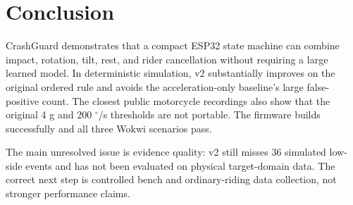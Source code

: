 \documentclass[12pt,a4paper]{article}
\newcommand{\degree}{\ensuremath{^{\circ}}}
\begin{document}
\section{Conclusion}

CrashGuard demonstrates that a compact ESP32 state machine can combine
impact, rotation, tilt, rest, and rider cancellation without requiring a
large learned model. In deterministic simulation, v2 substantially improves
on the original ordered rule and avoids the acceleration-only baseline's
large false-positive count. The closest public motorcycle recordings also
show that the original 4 g and 200 $\degree$/s thresholds are not portable.
The firmware builds successfully and all three Wokwi scenarios pass.

The main unresolved issue is evidence quality: v2 still misses 36 simulated
low-side events and has not been evaluated on physical target-domain data.
The correct next step is controlled bench and ordinary-riding data
collection, not stronger performance claims.

\clearpage
{\small

}
\end{document}
